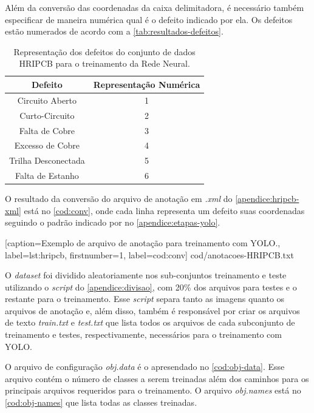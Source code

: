 Além da conversão das coordenadas da caixa delimitadora, é necessário também especificar de maneira numérica qual é o defeito indicado por ela. Os defeitos estão numerados de acordo com a \autoref{tab:resultados-defeitos}.

\begin{table}[!h]
  \begin{center}
  \caption{Representação dos defeitos do conjunto de dados HRIPCB para o treinamento da Rede Neural.}
  \label{tab:resultados-defeitos}
  \begin{tabular}{cc}
    \toprule
    \textbf{Defeito} & \textbf{Representação Numérica}\\
    \midrule \midrule
    Circuito Aberto     & 1 \\
    Curto-Circuito      & 2 \\
    Falta de Cobre      & 3 \\
    Excesso de Cobre    & 4 \\
    Trilha Desconectada & 5 \\
    Falta de Estanho    & 6 \\
    \bottomrule
  \end{tabular}
  \end{center}
\end{table}

O resultado da conversão do arquivo de anotação em \textit{.xml} do \autoref{apendice:hripcb-xml} está no \autoref{cod:conv}, onde cada linha representa um defeito suas coordenadas seguindo o padrão indicado por  no \autoref{apendice:etapas-yolo}.


[caption=Exemplo de arquivo de anotação para treinamento com YOLO.,
label=lst:hripcb,
firstnumber=1,
label=cod:conv]
{cod/anotacoes-HRIPCB.txt}

O \textit{dataset} foi dividido aleatoriamente nos sub-conjuntos treinamento e teste utilizando o \textit{script} do \autoref{apendice:divisao}, com 20\% dos arquivos para testes e o restante para o treinamento. Esse \textit{script} separa tanto as imagens quanto os arquivos de anotação e, além disso, também é responsável por criar os arquivos de texto \textit{train.txt} e \textit{test.txt} que lista todos os arquivos de cada subconjunto de treinamento e testes, respectivamente, necessários para o treinamento com YOLO.

O arquivo de configuração \textit{obj.data} é o apresendado no \autoref{cod:obj-data}. Esse arquivo contém o número de classes a serem treinadas além dos caminhos para os principais arquivos requeridos para o treinamento. O arquivo \textit{obj.names} está no \autoref{cod:obj-names} que lista todas as classes treinadas.

